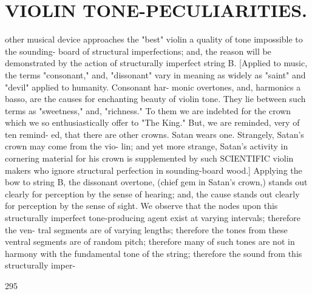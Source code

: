 \documentclass{article}
\begin{document}
\section*{VIOLIN TONE-PECULIARITIES.}
other musical device approaches the "best" violin a quality of tone impossible to the sounding- board of structural imperfections; and, the reason will be demonstrated by the action of structurally imperfect string B. [Applied to music, the terms "consonant," and, "dissonant" vary in meaning as widely as "saint" and "devil" applied to humanity. Consonant har- monic overtones, and, harmonics a basso, are the causes for enchanting beauty of violin tone. They lie between such terms as "sweetness," and, "richness." To them we are indebted for the crown which we so enthusiastically offer to "The King." But, we are reminded, very of ten remind- ed, that there are other crowns. Satan wears one. Strangely, Satan's crown may come from the vio- lin; and yet more strange, Satan's activity in cornering material for his crown is supplemented by such SCIENTIFIC violin makers who ignore structural perfection in sounding-board wood.] Applying the bow to string B, the dissonant overtone, (chief gem in Satan's crown,) stands out clearly for perception by the sense of hearing; and, the cause stands out clearly for perception by the sense of sight. We observe that the nodes upon this structurally imperfect tone-producing agent exist at varying intervals; therefore the ven- tral segments are of varying lengths; therefore the tones from these ventral segments are of random pitch; therefore many of such tones are not in harmony with the fundamental tone of the string; therefore the sound from this structurally imper-

295
\end{document}
